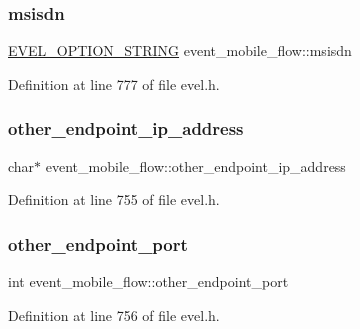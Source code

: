 \subsubsection{\texorpdfstring{msisdn}{msisdn}}
{\footnotesize\ttfamily \hyperlink{evel_8h_a0de5113a7b72de93c0c7b644f7ea7ec3}{E\+V\+E\+L\+\_\+\+O\+P\+T\+I\+O\+N\+\_\+\+S\+T\+R\+I\+NG} event\+\_\+mobile\+\_\+flow\+::msisdn}



Definition at line 777 of file evel.\+h.

\hypertarget{structevent__mobile__flow_ae171ca99234cc84f807d4bc8a71769ed}{}\label{structevent__mobile__flow_ae171ca99234cc84f807d4bc8a71769ed} 
\subsubsection{\texorpdfstring{other\+\_\+endpoint\+\_\+ip\+\_\+address}{other\_endpoint\_ip\_address}}
{\footnotesize\ttfamily char$\ast$ event\+\_\+mobile\+\_\+flow\+::other\+\_\+endpoint\+\_\+ip\+\_\+address}



Definition at line 755 of file evel.\+h.

\hypertarget{structevent__mobile__flow_a792df4bd771831bbca3bf062d611a0c8}{}\label{structevent__mobile__flow_a792df4bd771831bbca3bf062d611a0c8} 
\subsubsection{\texorpdfstring{other\+\_\+endpoint\+\_\+port}{other\_endpoint\_port}}
{\footnotesize\ttfamily int event\+\_\+mobile\+\_\+flow\+::other\+\_\+endpoint\+\_\+port}



Definition at line 756 of file evel.\+h.

\hypertarget{structevent__mobile__flow_a2fdb547b291d798b4b57de6b1489b383}{}\label{structevent__mobile__flow_a2fdb547b291d798b4b57de6b1489b383} 
